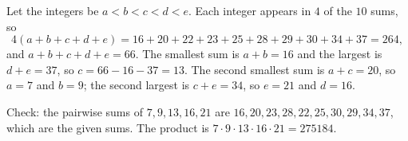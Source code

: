 Let the integers be $a<b<c<d<e$. Each integer appears in $4$ of the $10$ sums, so
\[
4(a+b+c+d+e)=16+20+22+23+25+28+29+30+34+37=264,
\]
and $a+b+c+d+e=66$. The smallest sum is $a+b=16$ and the largest is $d+e=37$, so $c=66-16-37=13$. The second smallest sum is $a+c=20$, so $a=7$ and $b=9$; the second largest is $c+e=34$, so $e=21$ and $d=16$.

Check: the pairwise sums of $7,9,13,16,21$ are $16,20,23,28,22,25,30,29,34,37$, which are the given sums. The product is $7\cdot9\cdot13\cdot16\cdot21=\boxed{275184}$.

